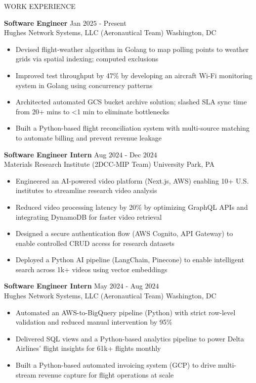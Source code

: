 \documentclass{resume} %
\begin{document}
\begin{rSection}{WORK EXPERIENCE}

{\bf Software Engineer} \hfill Jan $2025$ - Present\\
Hughes Network Systems, LLC (Aeronautical Team) \hfill Washington, DC
\begin{itemize}[itemsep = -4pt]
    \item Devised flight-weather algorithm in Golang to map polling points to weather grids via spatial indexing; computed exclusions
    \item Improved test throughput by 47\% by developing an aircraft Wi-Fi monitoring system in Golang using concurrency patterns
    \item Architected automated GCS bucket archive solution; slashed SLA sync time from 20+ mins to \textless 1 min to eliminate bottlenecks
    \item Built a Python-based flight reconciliation system with multi-source matching to automate billing and prevent revenue leakage
\end{itemize}

{\bf Software Engineer Intern} \hfill Aug $2024$ - Dec $2024$\\
Materials Research Institute (2DCC-MIP Team) \hfill University Park, PA
\begin{itemize}[itemsep = -4pt]
    \item Engineered an AI-powered video platform (Next.js, AWS) enabling 10+ U.S. institutes to streamline research video analysis
    \item Reduced video processing latency by 20\% by optimizing GraphQL APIs and integrating DynamoDB for faster video retrieval
    \item Designed a secure authentication flow (AWS Cognito, API Gateway) to enable controlled CRUD access for research datasets
    \item Deployed a Python AI pipeline (LangChain, Pinecone) to enable intelligent search across 1k+ videos using vector embeddings
\end{itemize}

{\bf Software Engineer Intern} \hfill May $2024$ - Aug $2024$\\
Hughes Network Systems, LLC (Aeronautical Team) \hfill Washington, DC
\begin{itemize}[itemsep = -4pt]
    \item Automated an AWS-to-BigQuery pipeline (Python) with strict row-level validation and reduced manual intervention by 95\%
    \item Delivered SQL views and a Python-based analytics pipeline to power Delta Airlines' flight insights for 61k+ flights monthly
    \item Built a Python-based automated invoicing system (GCP) to drive multi-stream revenue capture for flight operations at scale
\end{itemize}


\end{rSection}
\end{document}
